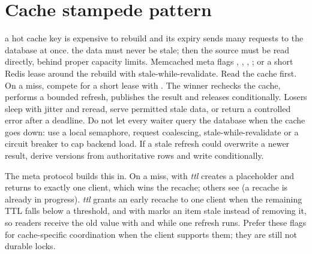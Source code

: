 \section{Cache stampede pattern}
{a hot cache key is expensive to rebuild and its expiry sends many requests to the database at once.}
{the data must never be stale; then the source must be read directly, behind proper capacity limits.}
{Memcached meta flags , , , ; or a short Redis lease around the rebuild with stale-while-revalidate.}
Read the cache first. On a miss, compete for a short lease with . The winner rechecks the cache, performs a bounded refresh, publishes the result and releases conditionally. Losers sleep with jitter and reread, serve permitted stale data, or return a controlled error after a deadline. Do not let every waiter query the database when the cache goes down: use a local semaphore, request coalescing, stale-while-revalidate or a circuit breaker to cap backend load. If a stale refresh could overwrite a newer result, derive versions from authoritative rows and write conditionally.

The meta protocol builds this in. On a miss,  with \textit{ttl} creates a placeholder and returns  to exactly one client, which wins the recache; others see  (a recache is already in progress). \textit{ttl} grants an early recache to one client when the remaining TTL falls below a threshold, and  with  marks an item stale instead of removing it, so readers receive the old value with  and  while one refresh runs. Prefer these flags for cache-specific coordination when the client supports them; they are still not durable locks.


